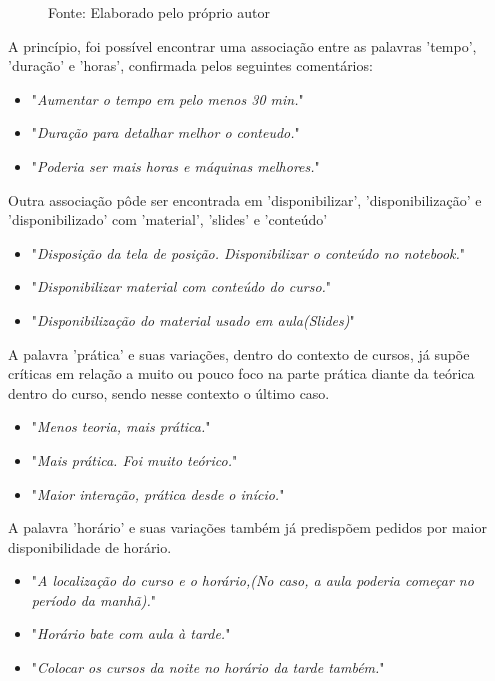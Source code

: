 \begin{figure}[H]
\label{fig:melhoriastopn}
\caption* {Fonte: Elaborado pelo próprio autor}
\end{figure}

A princípio, foi possível encontrar uma associação entre as palavras 'tempo', 'duração' e 'horas', confirmada pelos seguintes comentários:

\begin{itemize}
\item "\textit{Aumentar o tempo em pelo menos 30 min.}"
\item "\textit{Duração para detalhar melhor o conteudo.}"
\item "\textit{Poderia ser mais horas e máquinas melhores.}"
\end{itemize}

Outra associação pôde ser encontrada em 'disponibilizar', 'disponibilização' e 'disponibilizado' com 'material', 'slides' e 'conteúdo'

\begin{itemize}
\item "\textit{Disposição da tela de posição. Disponibilizar o conteúdo no notebook.}"
\item "\textit{Disponibilizar material com conteúdo do curso.}"
\item "\textit{Disponibilização do material usado em aula(Slides)}"
\end{itemize}

A palavra 'prática' e suas variações, dentro do contexto de cursos, já supõe críticas em relação a muito ou pouco foco na parte prática diante da teórica dentro do curso, sendo nesse contexto o último caso.

\begin{itemize}
\item "\textit{Menos teoria, mais prática.}"
\item "\textit{Mais prática. Foi muito teórico.}"
\item "\textit{Maior interação, prática desde o início.}"
\end{itemize}

A palavra 'horário' e suas variações também já predispõem pedidos por maior disponibilidade de horário.

\begin{itemize}
\item "\textit{A localização do curso e o horário,(No caso, a aula poderia começar no período da manhã).}"
\item "\textit{Horário bate com aula à tarde.}"
\item "\textit{Colocar os cursos da noite no horário da tarde também.}"
\end{itemize}

